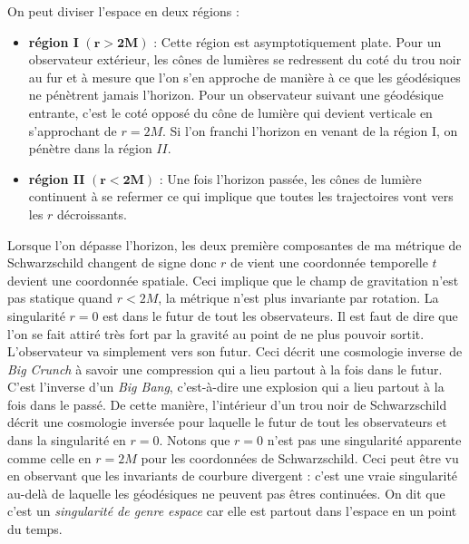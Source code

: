 \documentclass[a4paper,11pt]{report}
\theoremstyle{definition}
\theoremstyle{plain}
\theoremstyle{definition}
\theoremstyle{remark}
\begin{document}
            On peut diviser l'espace en deux régions :
            \begin{itemize}[label = \textbullet]
                \item \textbf{région I} $(\boldsymbol{r>2M})$ :  Cette région est asymptotiquement plate. Pour un observateur extérieur, les cônes de lumières se redressent du coté du trou noir au fur et à mesure que l'on s'en approche de manière à ce que les géodésiques ne pénètrent jamais l'horizon. Pour un observateur suivant une géodésique entrante, c'est le coté opposé du cône de lumière qui devient verticale en s'approchant de $r=2M$. Si l'on franchi l'horizon en venant de la région I, on pénètre dans la région $II$. 
                \item \textbf{région II} $(\boldsymbol{r<2M})$ : Une fois l'horizon passée, les cônes de lumière continuent à se refermer ce qui implique que toutes les trajectoires vont vers les $r$ décroissants.
            \end{itemize}
            Lorsque l'on dépasse l'horizon, les deux première composantes de ma métrique de Schwarzschild changent de signe donc $r$ de vient une coordonnée temporelle $t$ devient une coordonnée spatiale. Ceci implique que le champ de gravitation n'est pas statique quand $r<2M$, la métrique n'est plus invariante par rotation. La singularité $r=0$ est dans le futur de tout les observateurs. Il est faut de dire que l'on se fait attiré très fort par la gravité au point de ne plus pouvoir sortit. L'observateur va simplement vers son futur. Ceci décrit une cosmologie inverse de \textit{Big Crunch} à savoir une compression qui a lieu partout à la fois dans le futur. C'est l'inverse d'un \textit{Big Bang}, c'est-à-dire une explosion qui a lieu partout à la fois dans le passé. De cette manière, l'intérieur d'un trou noir de Schwarzschild décrit une cosmologie inversée pour laquelle le futur de tout les observateurs et dans la singularité en $r=0$. Notons que $r=0$ n'est pas une singularité apparente comme celle en $r=2M$ pour les coordonnées de Schwarzschild. Ceci peut être vu en observant que les invariants de courbure divergent : c'est une vraie singularité au-delà de laquelle les géodésiques ne peuvent pas êtres continuées. On dit que c'est un \textit{singularité de genre espace} car elle est partout dans l'espace en un point du temps.\\
            
            
\end{document}
